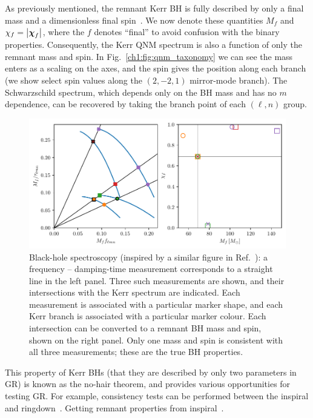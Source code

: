 As previously mentioned, the remnant Kerr BH is fully described by only a final mass and a dimensionless final spin~\cite{Carter:1971zc}.
We now denote these quantities $M_f$ and $\chi_f = \abs{\vb*{\chi}_f}$, where the $f$ denotes ``final'' to avoid confusion with the binary properties.
Consequently, the Kerr QNM spectrum is also a function of only the remnant mass and spin.
In Fig.~\ref{ch1:fig:qnm_taxonomy} we can see the mass enters as a scaling on the axes, and the spin gives the position along each branch (we show select spin values along the $(2,-2,1)$ mirror-mode branch).
The Schwarzschild spectrum, which depends only on the BH mass and has no $m$ dependence, can be recovered by taking the branch point of each $(\ell, n)$ group.

 \begin{figure}[t]
    \centering
    \includegraphics[width=\columnwidth]{Figures/Introduction/bh_spectroscopy.pdf}
    \caption[Black-hole spectroscopy illustration]{
    Black-hole spectroscopy (inspired by a similar figure in Ref.~\cite{Dreyer:2003bv}): a frequency -- damping-time measurement corresponds to a straight line in the left panel. Three such measurements are shown, and their intersections with the Kerr spectrum are indicated. Each measurement is associated with a particular marker shape, and each Kerr branch is associated with a particular marker colour. Each intersection can be converted to a remnant BH mass and spin, shown on the right panel. Only one mass and spin is consistent with all three measurements; these are the true BH properties.
    }
    \label{ch1:fig:bh_spectroscopy}
\end{figure}

This property of Kerr BHs (that they are described by only two parameters in GR) is known as the no-hair theorem, and provides various opportunities for testing GR.
For example, consistency tests can be performed between the inspiral and ringdown~\cite{Hughes:2004vw, Nakano:2015uja, Ghosh:2016qgn, Ghosh:2017gfp}.
Getting remnant properties from inspiral~\cite{Varma:2018aht}.

